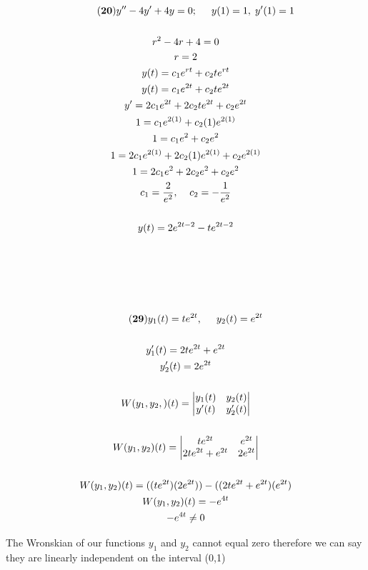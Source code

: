 \documentclass{article}
\begin{document}
\begin{gather*}\tag{\textbf{20}}
    y''-4y'+4y=0; \hspace{.5cm} y(1) = 1,\;y'(1)=1\\\\
    r^2-4r+4=0\\
    r = 2\\
    y(t) = c_1e^{rt}+c_2te^{rt}\\
    y(t) = c_1e^{2t}+c_2te^{2t}\\  
    y'= 2c_1e^{2t}+2c_2te^{2t}+c_2e^{2t}\\
    1 = c_1e^{2(1)}+c_2(1)e^{2(1)}\\
    1=c_1e^2+c_2e^2\\
    1 = 2c_1e^{2(1)}+2c_2(1)e^{2(1)}+c_2e^{2(1)}\\
    1 = 2c_1e^2+2c_2e^2+c_2e^2\\
    c_1 = \frac{2}{e^2},\;\;\;\;
    c_2 = -\frac{1}{e^2}\\\\
    y(t)=2e^{2t-2}-te^{2t-2}\\\\\\\\\\\\
    \tag{\textbf{29}}
    y_1(t)=te^{2t}, \hspace{.5cm} y_2(t) = e^{2t}\\\\
    y'_1(t) = 2te^{2t} + e^{2t}\\
    y'_2(t) = 2e^{2t}\\\\
    W(y_1,y_2,)(t) = 
    \begin{vmatrix}
        y_1(t) & y_2(t)\\
        y'(t) & y'_2(t)
    \end{vmatrix}\\\\
    W(y_1,y_2)(t) =
    \begin{vmatrix}
        te^{2t} & e^{2t}\\
        2te^{2t}+e^{2t} & 2e^{2t}
    \end{vmatrix}\\\\
    W(y_1,y_2)(t) = ((te^{2t})(2e^{2t}))-((2te^{2t}+e^{2t})(e^{2t})\\
    W(y_1,y_2)(t) = -e^{4t}\\
    -e^{4t} \neq 0\\
\end{gather*}
\begin{center}
The Wronskian of our functions $ y_1 $ and $ y_2 $  cannot equal zero therefore we can say they are linearly independent on the interval (0,1)\\
\end{center}
\newpage
\end{document}
